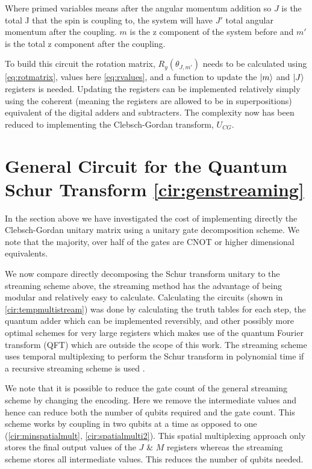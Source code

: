 \documentclass[12pt]{article}
\begin{document}
Where primed variables means after the angular momentum addition so $J$ is the total J that the spin is coupling to, the system will have $J'$ total angular momentum after the coupling. $m$ is the z component of the system before and $m'$ is the total z component after the coupling.

To build this circuit the rotation matrix, $R_y(\theta_{J,m'})$ needs to be calculated using \autoref{eq:rotmatrix}, values here \autoref{eq:rvalues}, and a function to update the $\left\vert{m}\right\rangle$ and $\left\vert{J}\right\rangle$ registers is needed. Updating the registers can be implemented relatively simply using the coherent (meaning the registers are allowed to be in superpositions) equivalent of the digital adders and subtracters. The complexity now has been reduced to implementing the Clebsch-Gordan transform, $U_{CG}$.

\section{General Circuit for the Quantum Schur Transform \autoref{cir:genstreaming}}

In the section above we have investigated the cost of implementing directly the Clebsch-Gordan unitary matrix using a unitary gate decomposition scheme. We note that the majority, over half of the gates are CNOT or higher dimensional equivalents.

We now compare directly decomposing the Schur transform unitary to the streaming scheme above, the streaming method has the advantage of being modular and relatively easy to calculate. Calculating the circuits (shown in \autoref{cir:tempmultistream}) was done by calculating the truth tables for each step, the quantum adder which can be implemented reversibly, \cite{draper2004logarithmic} and other possibly more optimal schemes for very large registers which makes use of the quantum Fourier transform (QFT) \cite{draper2000addition} which are outside the scope of this work. The streaming scheme uses temporal multiplexing to perform the Schur transform in polynomial time if a recursive streaming scheme is used \cite{bacon2007quantum}.

We note that it is possible to reduce the gate count of the general streaming scheme by changing the encoding. Here we remove the intermediate values and hence can reduce both the number of qubits required and the gate count. This scheme works by coupling in two qubits at a time as opposed to one (\autoref{cir:minspatialmult}, \autoref{cir:spatialmulti2}). This spatial multiplexing approach only stores the final output values of the $J$ \& $M$ registers whereas the streaming scheme stores all intermediate values. This reduces the number of qubits needed. 
\end{document}
